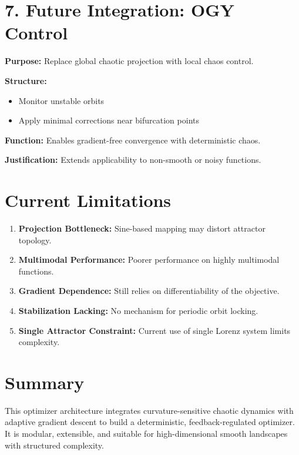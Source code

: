 \documentclass[11pt]{article}
\begin{document}
\section*{7. Future Integration: OGY Control}
\textbf{Purpose:} Replace global chaotic projection with local chaos control.

\textbf{Structure:}
\begin{itemize}[leftmargin=1.5em]
  \item Monitor unstable orbits
  \item Apply minimal corrections near bifurcation points
\end{itemize}

\textbf{Function:} Enables gradient-free convergence with deterministic chaos.

\textbf{Justification:} Extends applicability to non-smooth or noisy functions.

\section*{Current Limitations}
\begin{enumerate}[leftmargin=1.5em]
  \item \textbf{Projection Bottleneck:} Sine-based mapping may distort attractor topology.
  \item \textbf{Multimodal Performance:} Poorer performance on highly multimodal functions.
  \item \textbf{Gradient Dependence:} Still relies on differentiability of the objective.
  \item \textbf{Stabilization Lacking:} No mechanism for periodic orbit locking.
  \item \textbf{Single Attractor Constraint:} Current use of single Lorenz system limits complexity.
\end{enumerate}

\section*{Summary}
This optimizer architecture integrates curvature-sensitive chaotic dynamics with adaptive gradient descent to build a deterministic, feedback-regulated optimizer. It is modular, extensible, and suitable for high-dimensional smooth landscapes with structured complexity.
\end{document}
